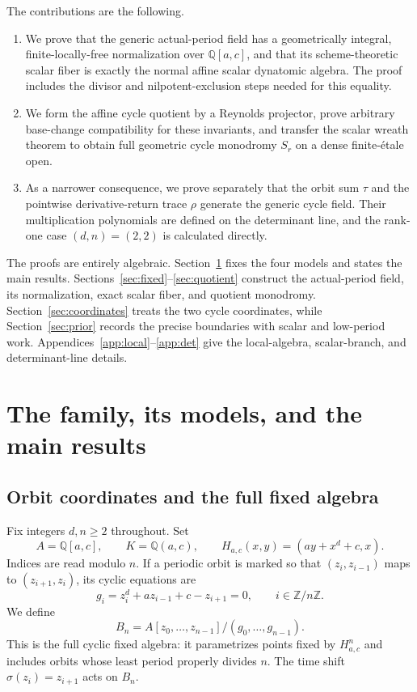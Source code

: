 \documentclass[11pt]{article}
\theoremstyle{definition}
\theoremstyle{remark}
\newcommand{\Q}{\mathbb{Q}}
\newcommand{\etale}{\'{e}tale}
\begin{document}
The contributions are the following.

\begin{enumerate}[label=(\roman*)]
\item We prove that the generic actual-period field has a geometrically
  integral, finite-locally-free normalization over $\Q[a,c]$, and that its
  scheme-theoretic scalar fiber is exactly the normal affine scalar
  dynatomic algebra.  The proof includes the divisor and nilpotent-exclusion
  steps needed for this equality.
\item We form the affine cycle quotient by a Reynolds projector, prove
  arbitrary base-change compatibility for these invariants, and transfer the
  scalar wreath theorem to obtain full geometric cycle monodromy $S_r$ on a
  dense finite-\etale{} open.
\item As a narrower consequence, we prove separately that the orbit sum
  $\tau$ and the pointwise derivative-return trace $\rho$ generate the
  generic cycle field.  Their multiplication polynomials are defined on the
  determinant line, and the rank-one case $(d,n)=(2,2)$ is calculated
  directly.
\end{enumerate}

The proofs are entirely algebraic.  Section~\ref{sec:objects} fixes the four
models and states the main results.  Sections~\ref{sec:fixed}--\ref{sec:quotient}
construct the actual-period field, its normalization, exact scalar fiber,
and quotient monodromy.  Section~\ref{sec:coordinates} treats the two cycle
coordinates, while Section~\ref{sec:prior} records the precise boundaries
with scalar and low-period work.  Appendices~\ref{app:local}--\ref{app:det}
give the local-algebra, scalar-branch, and determinant-line details.

\section{The family, its models, and the main results}\label{sec:objects}

\subsection{Orbit coordinates and the full fixed algebra}

Fix integers $d,n\geq2$ throughout.  Set
\[
 A=\Q[a,c],\qquad K=\Q(a,c),\qquad
 H_{a,c}(x,y)=(ay+x^d+c,x).
\]
Indices are read modulo $n$.  If a periodic orbit is marked so that
$(z_i,z_{i-1})$ maps to $(z_{i+1},z_i)$, its cyclic equations are
\begin{equation}\label{eq:cyclic-equations}
 g_i=z_i^d+az_{i-1}+c-z_{i+1}=0,
 \qquad i\in\mathbb Z/n\mathbb Z.
\end{equation}
We define
\begin{equation}\label{eq:Bn}
 B_n=A[z_0,\ldots,z_{n-1}]/(g_0,\ldots,g_{n-1}).
\end{equation}
This is the full cyclic fixed algebra: it parametrizes points fixed by
$H_{a,c}^n$ and includes orbits whose least period properly divides $n$.
The time shift $\sigma(z_i)=z_{i+1}$ acts on $B_n$.
\end{document}

